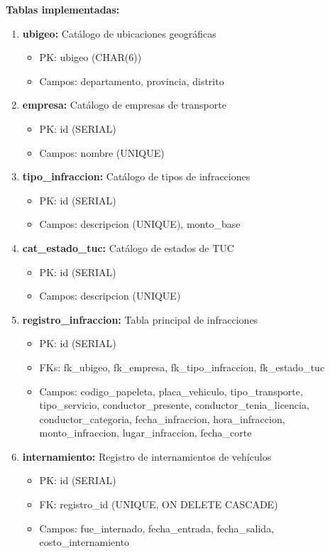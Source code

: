 \documentclass[12pt,a4paper]{article}
\begin{document}
\textbf{Tablas implementadas:}

\begin{enumerate}
    \item \textbf{ubigeo:} Catálogo de ubicaciones geográficas
    \begin{itemize}
        \item PK: ubigeo (CHAR(6))
        \item Campos: departamento, provincia, distrito
    \end{itemize}
    
    \item \textbf{empresa:} Catálogo de empresas de transporte
    \begin{itemize}
        \item PK: id (SERIAL)
        \item Campos: nombre (UNIQUE)
    \end{itemize}
    
    \item \textbf{tipo\_infraccion:} Catálogo de tipos de infracciones
    \begin{itemize}
        \item PK: id (SERIAL)
        \item Campos: descripcion (UNIQUE), monto\_base
    \end{itemize}
    
    \item \textbf{cat\_estado\_tuc:} Catálogo de estados de TUC
    \begin{itemize}
        \item PK: id (SERIAL)
        \item Campos: descripcion (UNIQUE)
    \end{itemize}
    
    \item \textbf{registro\_infraccion:} Tabla principal de infracciones
    \begin{itemize}
        \item PK: id (SERIAL)
        \item FKs: fk\_ubigeo, fk\_empresa, fk\_tipo\_infraccion, fk\_estado\_tuc
        \item Campos: codigo\_papeleta, placa\_vehiculo, tipo\_transporte, tipo\_servicio, conductor\_presente, conductor\_tenia\_licencia, conductor\_categoria, fecha\_infraccion, hora\_infraccion, monto\_infraccion, lugar\_infraccion, fecha\_corte
    \end{itemize}
    
    \item \textbf{internamiento:} Registro de internamientos de vehículos
    \begin{itemize}
        \item PK: id (SERIAL)
        \item FK: registro\_id (UNIQUE, ON DELETE CASCADE)
        \item Campos: fue\_internado, fecha\_entrada, fecha\_salida, costo\_internamiento
    \end{itemize}
    

\end{enumerate}
\end{document}
